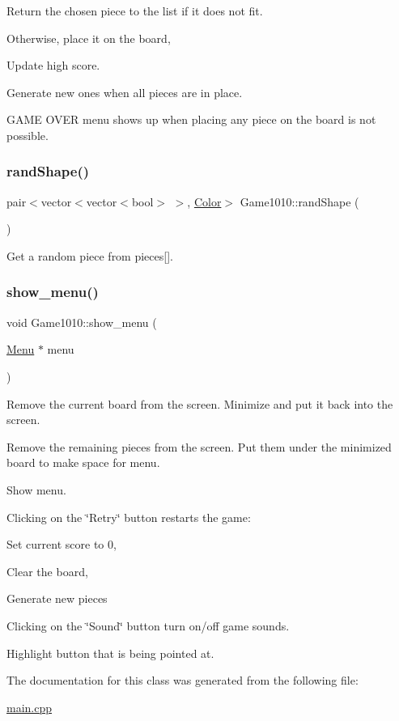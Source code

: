 Return the chosen piece to the list if it does not fit.

Otherwise, place it on the board,

Update high score.

Generate new ones when all pieces are in place.

G\+A\+ME O\+V\+ER menu shows up when placing any piece on the board is not possible. \mbox{\label{class_game1010_ae4c1d03b230aafd1c77e038e1e43c272}} 
\subsubsection{\texorpdfstring{rand\+Shape()}{randShape()}}
{\footnotesize\ttfamily pair$<$vector$<$vector$<$bool$>$ $>$, \mbox{\hyperlink{class_color}{Color}}$>$ Game1010\+::rand\+Shape (\begin{DoxyParamCaption}{ }\end{DoxyParamCaption})\hspace{0.3cm}{\ttfamily [inline]}}



Get a random piece from pieces\mbox{[}\mbox{]}. 

\mbox{\label{class_game1010_a99d6f53c3073861fe37ef67caa073840}} 
\subsubsection{\texorpdfstring{show\+\_\+menu()}{show\_menu()}}
{\footnotesize\ttfamily void Game1010\+::show\+\_\+menu (\begin{DoxyParamCaption}\item[{\mbox{\hyperlink{class_menu}{Menu}} $\ast$}]{menu }\end{DoxyParamCaption})\hspace{0.3cm}{\ttfamily [inline]}}

Remove the current board from the screen. Minimize and put it back into the screen.

Remove the remaining pieces from the screen. Put them under the minimized board to make space for menu.

Show menu.

Clicking on the \char`\"{}\+Retry\char`\"{} button restarts the game\+:

Set current score to 0,

Clear the board,

Generate new pieces

Clicking on the \char`\"{}\+Sound\char`\"{} button turn on/off game sounds.

Highlight button that is being pointed at.

The documentation for this class was generated from the following file\+:\begin{DoxyCompactItemize}
\item 
\mbox{\hyperlink{main_8cpp}{main.\+cpp}}\end{DoxyCompactItemize}
